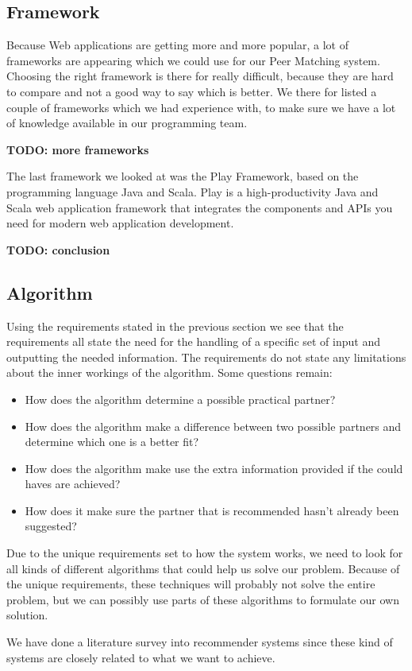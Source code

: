 \documentclass[]{article}
\newcommand{\TODO}[1]{{\color{red}\textbf{TODO: #1}}}
\begin{document}
\subsection{Framework}
Because Web applications are getting more and more popular, a lot of frameworks are appearing which we could use for our Peer Matching system.
Choosing the right framework is there for really difficult, because they are hard to compare and not a good way to say which is better.
We there for listed a couple of frameworks which we had experience with, to make sure we have a lot of knowledge available in our programming team.

\TODO{more frameworks}

The last framework we looked at was the Play Framework\cite{play}, based on the programming language Java and Scala.
Play is a high-productivity Java and Scala web application framework that integrates the components and APIs you need for modern web application development.

\TODO{conclusion}

\subsection{Algorithm}
Using the requirements stated in the previous section we see that the requirements all state the need for the handling of a specific set of input and outputting the needed information.
The requirements do not state any limitations about the inner workings of the algorithm.
Some questions remain:
\begin{itemize}
\item How does the algorithm determine a possible practical partner?
\item How does the algorithm make a difference between two possible partners and determine which one is a better fit?
\item How does the algorithm make use the extra information provided if the could haves are achieved?
\item How does it make sure the partner that is recommended hasn't already been suggested?
\end{itemize}
Due to the unique requirements set to how the system works, we need to look for all kinds of different algorithms that could help us solve our problem.
Because of the unique requirements, these techniques will probably not solve the entire problem, but we can possibly use parts of these algorithms to formulate our own solution.

We have done a literature survey into recommender systems since these kind of systems are closely related to what we want to achieve.
\end{document}
